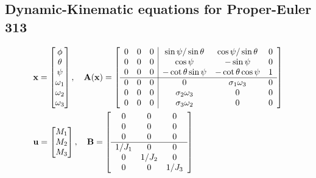 \subsection{Dynamic-Kinematic equations for Proper-Euler 313}
\begin{equation}
    \begin{aligned}
        &\mathbf{x}=\begin{bmatrix}
            \phi\\\theta\\\psi\\\omega_1\\\omega_2\\\omega_3
        \end{bmatrix}, \quad
        \mathbf{A(x)}=
        \left[
        \begin{array}{c|c}
            \begin{matrix}
                0&0&0\\0&0&0\\0&0&0\\
                \hline
                0&0&0\\0&0&0\\0&0&0
            \end{matrix}
            &
            \begin{matrix}
                \sin\psi/\sin\theta&\cos\psi/\sin\theta&0\\
                \cos\psi&-\sin\psi&0\\
                -\cot\theta\sin\psi&-\cot\theta\cos\psi&1\\
                \hline
                0&\sigma_1\omega_3&0\\
                \sigma_2\omega_3&0&0\\
                \sigma_3\omega_2&0&0
            \end{matrix} 
        \end{array}
        \right]\\\vspace{1cm}
        &\mathbf{u}=\begin{bmatrix}
            M_1\\M_2\\M_3
        \end{bmatrix}, \quad
        \mathbf{B}=
            \left[
                \begin{array}{c}
                    \begin{matrix}
                        0&0&0\\0&0&0\\0&0&0\\
                    \hline
                        1/J_1&0&0\\0&1/J_2&0\\0&0&1/J_3
                    \end{matrix}
                \end{array}
            \right]
    \end{aligned}
\end{equation}


